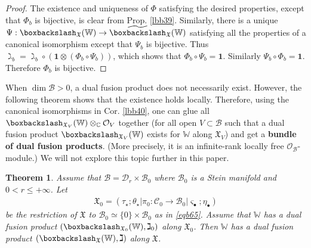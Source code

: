 \documentclass[11pt,b5paper,notitlepage]{article}
\theoremstyle{definition}
\theoremstyle{plain}
\newtheorem{thm}[df]{Theorem}
\newcommand{\mc}{\mathcal}
\newcommand{\wtd}{\widetilde}
\newcommand{\idt}{\mathbf{1}}
\newcommand{\sgm}{\varsigma}
\newcommand{\blt}{\bullet}
\newcommand{\Wbb}{\mathbb W}
\newcommand{\Cbb}{\mathbb C}
\newcommand{\<}{\left\langle}
\renewcommand{\>}{\right\rangle}
\newcommand{\MC}{\mathcal{C}}
\newcommand{\MB}{\mathcal{B}}
\newcommand{\fx}{\mathfrak{X}}
\newcommand{\bbs}{\boxbackslash}
\numberwithin{equation}{subsection}
\begin{document}
\begin{proof}
The existence and uniqueness of $\Phi$ satisfying the desired properties, except that $\Phi_b$ is bijective, is clear from Prop. \ref{lbb39}. Similarly, there is a unique $\Psi:\bbs_\fx(\Wbb)\rightarrow\wtd\bbs_\fx(\Wbb)$ satisfying all the properties of a canonical isomorphism except that $\Psi_b$ is bijective. Thus $\gimel_b=\gimel_b\circ(\idt\otimes(\Phi_b\circ\Psi_b))$, which shows that $\Phi_b\circ\Psi_b=\idt$. Similarly $\Psi_b\circ\Phi_b=\idt$. Therefore $\Phi_b$ is bijective. 
\end{proof}






When $\dim\MB>0$, a dual fusion product does not necessarily exist.  However, the following theorem shows that the existence holds locally. Therefore, using the canonical isomorphisms in Cor. \ref{lbb40}, one can glue all $\bbs_{\fx_V}(\Wbb)\otimes_\Cbb \mc O_V$ together (for all open $V\subset\MB$ such that a dual fusion product $\bbs_{\fx_V}(\Wbb)$ exists for $\Wbb$ along $\fx_V$) and get a \textbf{bundle of dual fusion products}. (More precisely, it is an infinite-rank locally free $\mc O_\MB$-module.) We will not explore this topic further in this paper.

\begin{thm}\label{lbb37}
Assume that $\MB=\mc D_r\times\MB_0$ where $\MB_0$ is a Stein manifold and $0<r\leq +\infty$. Let
\begin{align*}
\fx_0=(\tau_\star;\theta_\star|\pi_0:\MC_0\rightarrow\MB_0|\sgm_\blt;\eta_\blt)
\end{align*}
be the restriction of $\fx$ to $\MB_0\simeq\{0\}\times\MB_0$ as in \eqref{eqb65}. Assume that $\Wbb$ has a dual fusion product $(\bbs_{\fx_0}(\Wbb),\gimel_0)$ along $\fx_0$. Then $\Wbb$ has a dual fusion product $(\bbs_\fx(\Wbb),\gimel)$ along $\fx$.
\end{thm}
\end{document}
